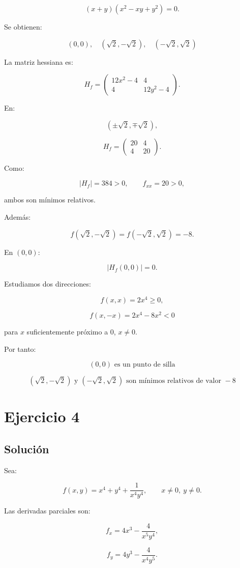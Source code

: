 \documentclass[11pt,a4paper]{article}
\begin{document}
\[
(x+y)(x^2-xy+y^2)=0.
\]

Se obtienen:

\[
\boxed{
(0,0),
\quad
(\sqrt2,-\sqrt2),
\quad
(-\sqrt2,\sqrt2)
}
\]

La matriz hessiana es:

\[
H_f=
\begin{pmatrix}
12x^2-4&4\\
4&12y^2-4
\end{pmatrix}.
\]

En:

\[
(\pm\sqrt2,\mp\sqrt2),
\]

\[
H_f=
\begin{pmatrix}
20&4\\
4&20
\end{pmatrix}.
\]

Como:

\[
|H_f|=384>0,
\qquad
f_{xx}=20>0,
\]

ambos son mínimos relativos.

Además:

\[
f(\sqrt2,-\sqrt2)
=
f(-\sqrt2,\sqrt2)
=
-8.
\]

En \((0,0)\):

\[
|H_f(0,0)|=0.
\]

Estudiamos dos direcciones:

\[
f(x,x)=2x^4\geq0,
\]

\[
f(x,-x)=2x^4-8x^2<0
\]

para \(x\) suficientemente próximo a \(0\), \(x\neq0\).

Por tanto:

\[
\boxed{
(0,0)\text{ es un punto de silla}
}
\]

\[
\boxed{
(\sqrt2,-\sqrt2)
\text{ y }
(-\sqrt2,\sqrt2)
\text{ son mínimos relativos de valor }-8
}
\]

\section{Ejercicio 4}
\subsection{Solución}

Sea:

\[
f(x,y)
=
x^4+y^4+\frac1{x^4y^4},
\qquad
x\neq0,\ y\neq0.
\]

Las derivadas parciales son:

\[
f_x
=
4x^3-\frac4{x^5y^4},
\]

\[
f_y
=
4y^3-\frac4{x^4y^5}.
\]
\end{document}
